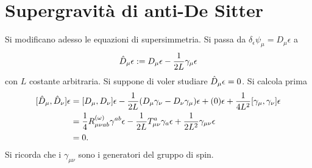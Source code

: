 \section{Supergravità di anti-De Sitter}
Si modificano adesso le equazioni di supersimmetria. Si passa da $\delta_\epsilon\psi_\mu = D_\mu\epsilon$ a 
\begin{equation}
    \hat{D}_\mu\epsilon := D_\mu\epsilon - \frac{1}{2L}\gamma_\mu\epsilon
\end{equation}
con $L$ costante arbitraria. Si suppone di voler studiare $\hat{D}_\mu\epsilon = 0$. Si calcola prima 
\begin{equation}
    \begin{split}
        [\hat{D}_\mu,\hat{D}_\nu]\epsilon &= [D_\mu,D_\nu]\epsilon - \frac{1}{2L}(D_\mu\gamma_\nu - D_\nu\gamma_\mu)\epsilon + (0)\epsilon + \frac{1}{4L^2}[\gamma_\mu,\gamma_\nu]\epsilon \\
        &= \frac{1}{4}R_{\mu\nu ab}^{(\omega)}\gamma^{ab}\epsilon - \frac{1}{2L}T^a_{\mu\nu}\gamma_a\epsilon + \frac{1}{2L^2}\gamma_{\mu\nu}\epsilon \\
        &= 0.
    \end{split}
\end{equation}
Si ricorda che i $\gamma_{\mu\nu}$ sono i generatori del gruppo di spin. 

